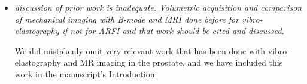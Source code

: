 \documentclass[10pt]{article}
\begin{document}
\begin{itemize}
    \item \textit{discussion of prior work is inadequate. Volumetric
            acquisition and comparison of mechanical imaging with B-mode and
            MRI done before for vibro-elastography if not for ARFI and that
            work should be cited and discussed.}

    We did mistakenly omit very relevant work that has been done with
    vibro-elastography and MR imaging in the prostate, and we have included
    this work in the manuscript's Introduction:

    \textbf{}

\end{itemize}
\end{document}
